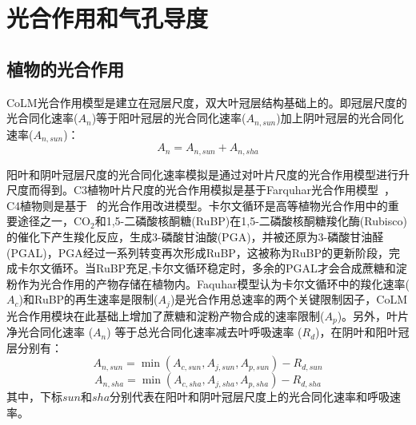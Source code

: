 \chapter{光合作用和气孔导度}


\section{植物的光合作用}\label{植物的光合作用}
CoLM光合作用模型是建立在冠层尺度，双大叶冠层结构基础上的。即冠层尺度的光合同化速率($A_{n}$)等于阳叶冠层的光合同化速率($A_{n,sun}$)加上阴叶冠层的光合同化速率($A_{n,sun}$)：
\begin{equation}\label{Ansun_Ansha}
A_{n}=A_{n,sun}+A_{n,sha}
\end{equation}

阳叶和阴叶冠层尺度的光合同化速率模拟是通过对叶片尺度的光合作用模型进行升尺度而得到。C3植物叶片尺度的光合作用模拟是基于Farquhar光合作用模型~\citep{farquhar1980biochemical}，
C4植物则是基于~\citet{collatz1992} 的光合作用改进模型。卡尔文循环是高等植物光合作用中的重要途径之一，CO$_2$和1,5-二磷酸核酮糖(RuBP)在1,5-二磷酸核酮糖羧化酶(Rubisco)的催化下产生羧化反应，生成3-磷酸甘油酸(PGA)，并被还原为3-磷酸甘油醛(PGAL)，PGA经过一系列转变再次形成RuBP，这被称为RuBP的更新阶段，完成卡尔文循环。当RuBP充足,卡尔文循环稳定时，多余的PGAL才会合成蔗糖和淀粉作为光合作用的产物存储在植物内。Faquhar模型认为卡尔文循环中的羧化速率($A_{c}$)和RuBP的再生速率是限制($A_{j}$)是光合作用总速率的两个关键限制因子，CoLM光合作用模块在此基础上增加了蔗糖和淀粉产物合成的速率限制($A_{p}$)。另外，叶片净光合同化速率 ($A_{n}$) 等于总光合同化速率减去叶呼吸速率 ($R_d$)，在阴叶和阳叶冠层分别有：
\begin{equation}\label{An1sun}
A_{n,sun}=\min \left(A_{c,sun}, A_{j,sun}, A_{p,sun}\right)-R_{d,sun}
\end{equation}
\begin{equation}\label{An1sha}
A_{n,sha}=\min \left(A_{c,sha}, A_{j,sha}, A_{p,sha}\right)-R_{d,sha}
\end{equation}
其中，下标$sun$和$sha$分别代表在阳叶和阴叶冠层尺度上的光合同化速率和呼吸速率。


